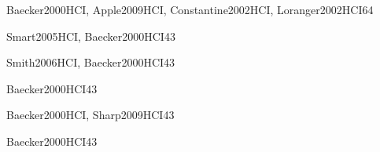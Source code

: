 \begin{syllabus}
\begin{unit}{\HCBuildingGUIInterfacesDef}{}{Baecker2000HCI, Apple2009HCI, Constantine2002HCI, Loranger2002HCI}{6}{4}
    \HCBuildingGUIInterfacesAllTopics
    \HCBuildingGUIInterfacesAllObjectives
\end{unit}

\begin{unit}{\HCGUIProgrammingDef}{}{Smart2005HCI, Baecker2000HCI}{4}{3}
    \HCGUIProgrammingAllTopics
    \HCGUIProgrammingAllObjectives
\end{unit}

\begin{unit}{\HCMultimediaAndMultimodalSystemsDef}{}{Smith2006HCI, Baecker2000HCI}{4}{3}
    \HCMultimediaAndMultimodalSystemsAllTopics
    \HCMultimediaAndMultimodalSystemsAllObjectives
\end{unit}

\begin{unit}{\HCCollaborationAndCommunicationDef}{}{Baecker2000HCI}{4}{3}
    \HCCollaborationAndCommunicationAllTopics
    \HCCollaborationAndCommunicationAllObjectives
\end{unit}

\begin{unit}{\HCInteractionDesignForNewEnvironmentsDef}{}{Baecker2000HCI, Sharp2009HCI}{4}{3}
    \HCInteractionDesignForNewEnvironmentsAllTopics
    \HCInteractionDesignForNewEnvironmentsAllObjectives
\end{unit}

\begin{unit}{\HCHumanFactorsAndSecurityDef}{}{Baecker2000HCI}{4}{3}
    \HCHumanFactorsAndSecurityAllTopics
    \HCHumanFactorsAndSecurityAllObjectives
\end{unit}

\begin{coursebibliography}
\end{coursebibliography}
\end{syllabus}
